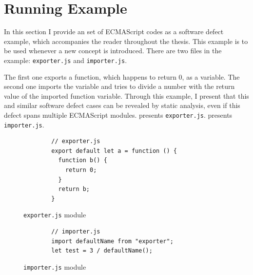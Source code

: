 \section{Running Example}

In this section I provide an set of ECMAScript codes as a software defect example, which accompanies the reader throughout the thesis. This example is to be used whenever a new concept is introduced. There are two files in the example: \texttt{exporter.js} and \texttt{importer.js}.

The first one exports a function, which happens to return $0$, as a variable. The second one imports the variable and tries to divide a number with the return value of the imported function variable. Through this example, I present that this and similar software defect cases can be revealed by static analysis, even if this defect spans multiple ECMAScript modules.  presents \texttt{exporter.js}.  presents \texttt{importer.js}.

\begin{figure}[!htb]
	\centering
	\begin{minipage}{25em}
		\begin{verbatim}
		// exporter.js
		export default let a = function () {
		  function b() {
		    return 0;
		  }
		  return b;
		}
		\end{verbatim}
	\end{minipage}
  \caption{\texttt{exporter.js} module}
  \label{fig:running-example-exporter}
\end{figure}

\begin{figure}[!htb]
	\centering
	\begin{minipage}{25em}
		\begin{verbatim}
		// importer.js
		import defaultName from "exporter";
		let test = 3 / defaultName();
		\end{verbatim}
	\end{minipage}
  \caption{\texttt{importer.js} module}
  \label{fig:running-example-importer}
\end{figure}

